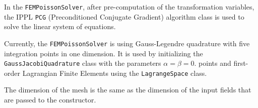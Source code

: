 In the \texttt{FEMPoissonSolver}, after pre-computation of the transformation variables,
the IPPL \texttt{PCG} (Preconditioned Conjugate Gradient) algorithm class is used
to solve the linear system of equations.

Currently, the \texttt{FEMPoissonSolver} is using Gauss-Legendre quadrature with five integration points in one dimension.
It is used by initializing the
\texttt{GaussJacobiQuadrature} class with the parameters $\alpha = \beta = 0$.
points and first-order Lagrangian Finite Elements using the \texttt{LagrangeSpace} class.

The dimension of the mesh is the same as the dimension of the input fields that are passed to the constructor.
